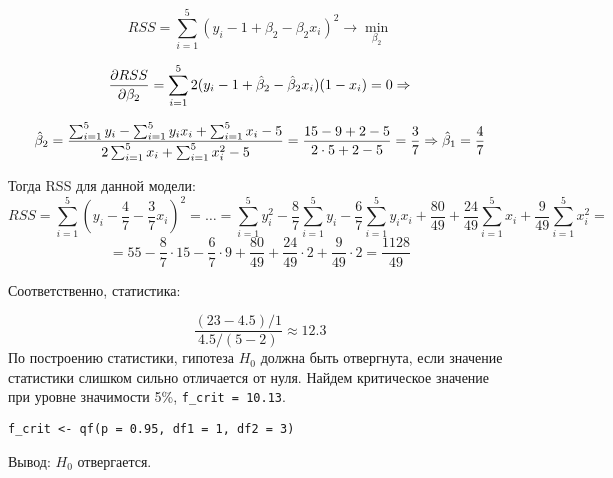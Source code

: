 \begin{problem}
\begin{sol}
\[
RSS = \sum_{i=1}^5 (y_i-1+\beta_2 - \beta_2x_i)^2 \rightarrow \min\limits_{\beta_2}
\]

\[
\frac{\partial RSS}{\partial \beta_2} = \sum_{i=1}^5 2(y_i-1+\hat{\beta}_2-\hat{\beta}_2x_i)(1-x_i) = 0 \Rightarrow
\]

\[
 \hat{\beta}_2 = \frac{\sum_{i=1}^5y_i - \sum_{i=1}^5y_ix_i + \sum_{i=1}^5x_i - 5 }{2\sum_{i=1}^5x_i+\sum_{i=1}^5x^2_i - 5} = \frac{15 - 9 +2 -5}{2\cdot5 +2 - 5} = \frac{3}{7} \Rightarrow \hat{\beta}_1 = \frac{4}{7}
\]

Тогда RSS для данной модели:
\[
RSS = \sum_{i=1}^5 \left(y_i-\frac{4}{7} - \frac{3}{7}x_i\right)^2 = \dots = \sum_{i=1}^5 y_i^2 - \frac{8}{7}\sum_{i=1}^5 y_i -\frac{6}{7}\sum_{i=1}^5 y_ix_i + \frac{80}{49} + \frac{24}{49}\sum_{i=1}^5 x_i + \frac{9}{49}\sum_{i=1}^5 x_i^2 =
\]
\[
= 55 - \frac{8}{7}\cdot15-\frac{6}{7}\cdot9 + \frac{80}{49} + \frac{24}{49}\cdot2+ \frac{9}{49}\cdot2 = \frac{1128}{49}
\]

Соответственно, статистика:

\[
\frac{(23-4.5)/1}{4.5/(5-2)} \approx 12.3
\]
По построению статистики, гипотеза $H_0$ должна быть отвергнута, если значение статистики слишком сильно отличается от нуля. Найдем критическое значение при уровне значимости 5\%, \verb|f_crit = 10.13|.
\begin{verbatim}
f_crit <- qf(p = 0.95, df1 = 1, df2 = 3)
\end{verbatim}
Вывод: $H_0$ отвергается.

\end{sol}
\end{problem}




